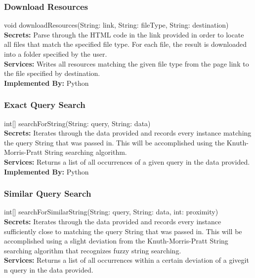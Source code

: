 \documentclass[titlepage]{article}
\begin{document}
\subsubsection{Download Resources}
void downloadResources(String: link, String: fileType, String: destination)\\

\textbf{Secrets:}
Parse through the HTML code in the link provided in order to locate all files that match the specified file type. For each file, the result is downloaded into a folder specified by the user.\\

\textbf{Services:}
Writes all resources matching the given file type from the page link to the file specified by destination.\\

\textbf{Implemented By:}
Python

\subsubsection{Exact Query Search}
int[] searchForString(String: query, String: data)\\

\textbf{Secrets:}
Iterates through the data provided and records every instance matching the query String that was passed in. This will be accomplished using the Knuth-Morris-Pratt String searching algorithm.\\

\textbf{Services:}
Returns a list of all occurrences of a given query in the data provided.\\

\textbf{Implemented By:}
Python


\subsubsection{Similar Query Search}
int[] searchForSimilarString(String: query, String: data, int: proximity)\\

\textbf{Secrets:}
Iterates through the data provided and records every instance sufficiently close to matching the query String that was passed in. This will be accomplished using a slight deviation from the Knuth-Morris-Pratt String searching algorithm that recognizes fuzzy string searching.\\

\textbf{Services:}
Returns a list of all occurrences within a certain deviation of a givegit n query in the data provided.\\
\end{document}
